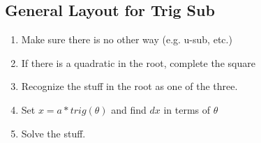 \documentclass[a4paper,12pt]{report}
\begin{document}
\subsection{General Layout for Trig Sub}
\begin{enumerate}
\item Make sure there is no other way (e.g. u-sub, etc.)
\item If there is a quadratic in the root, complete the square
\item Recognize the stuff in the root as one of the three.
\item Set $x = a*trig(\theta)$ and find $dx$ in terms of $\theta$
\item Solve the stuff.

\end{enumerate}
\end{document}
